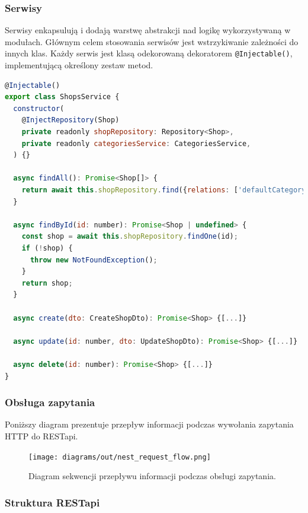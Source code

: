 \subsubsection{Serwisy}

Serwisy enkapsulują i dodają warstwę abstrakcji nad logikę wykorzystywaną w modułach. Głównym celem stosowania serwisów jest wstrzykiwanie zależności do innych klas. Każdy serwis jest klasą odekorowaną dekoratorem \lstinline{@Injectable()}, implementującą określony zestaw metod.

\begin{lstlisting}[language=JavaScript, caption={Implementacja serwisu \lstinline{ShopsService}.}, label=lst:nest:service]
@Injectable()
export class ShopsService {
  constructor(
    @InjectRepository(Shop)
    private readonly shopRepository: Repository<Shop>,
    private readonly categoriesService: CategoriesService,
  ) {}

  async findAll(): Promise<Shop[]> {
    return await this.shopRepository.find({relations: ['defaultCategory']});
  }

  async findById(id: number): Promise<Shop | undefined> {
    const shop = await this.shopRepository.findOne(id);
    if (!shop) {
      throw new NotFoundException();
    }
    return shop;
  }

  async create(dto: CreateShopDto): Promise<Shop> {[...]}

  async update(id: number, dto: UpdateShopDto): Promise<Shop> {[...]}

  async delete(id: number): Promise<Shop> {[...]}
}
  \end{lstlisting}

\newpage
\subsubsection{Obsługa zapytania}

Poniższy diagram prezentuje przepływ informacji podczas wywołania zapytania HTTP do \mbox{RESTapi.}

\begin{figure}[H]
  \centering
  \texttt{[image: diagrams/out/nest\_request\_flow.png]}
  \caption{Diagram sekwencji przepływu informacji podczas obsługi zapytania.}
\end{figure}

\newpage
\subsubsection{Struktura RESTapi}


